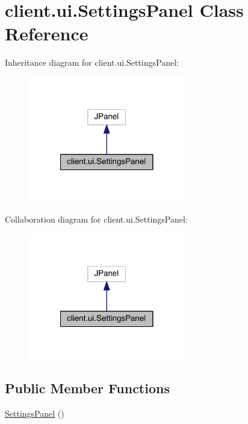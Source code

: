 \hypertarget{classclient_1_1ui_1_1_settings_panel}{}\section{client.\+ui.\+Settings\+Panel Class Reference}
\label{classclient_1_1ui_1_1_settings_panel}


Inheritance diagram for client.\+ui.\+Settings\+Panel\+:
\nopagebreak
\begin{figure}[H]
\begin{center}
\leavevmode
\includegraphics[width=194pt]{classclient_1_1ui_1_1_settings_panel__inherit__graph}
\end{center}
\end{figure}


Collaboration diagram for client.\+ui.\+Settings\+Panel\+:
\nopagebreak
\begin{figure}[H]
\begin{center}
\leavevmode
\includegraphics[width=194pt]{classclient_1_1ui_1_1_settings_panel__coll__graph}
\end{center}
\end{figure}
\subsection*{Public Member Functions}
\begin{DoxyCompactItemize}
\item 
\hyperlink{classclient_1_1ui_1_1_settings_panel_a95dfa76100b4d18863cd0b572c631ebf}{Settings\+Panel} ()
\end{DoxyCompactItemize}


